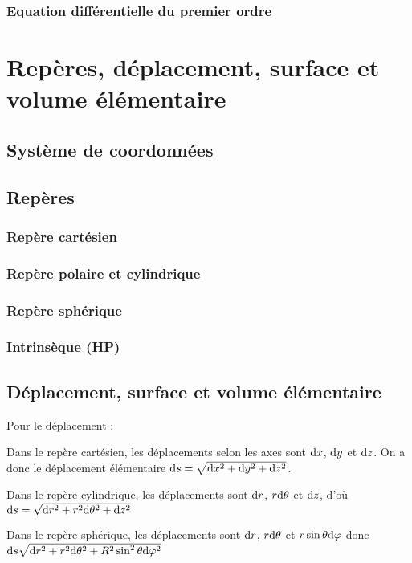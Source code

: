 \documentclass[a4paper,french,bookmarks]{book}
\begin{document}
    \subsubsection{Equation différentielle du premier ordre}
    
    \section{Repères, déplacement, surface et volume élémentaire}
    
    \subsection{Système de coordonnées}
    
    \subsection{Repères}
    
    \subsubsection{Repère cartésien}
    
    \subsubsection{Repère polaire et cylindrique}
    
    \subsubsection{Repère sphérique}
    
    \subsubsection{Intrinsèque (HP)}
    
    \subsection{Déplacement, surface et volume élémentaire}
    
    Pour le déplacement :
    
    \begin{enumerate}
        \itt Dans le repère cartésien, les déplacements selon les axes sont $\mathrm d x$, $\mathrm d y$ et $\mathrm d z$. On a donc le déplacement élémentaire $\mathrm d s = \sqrt{\mathrm d x^2 + \mathrm d y^2 + \mathrm d z^2}$.
        
        \itt Dans le repère cylindrique, les déplacements sont $\mathrm d r$, $r \mathrm d \theta$ et $\mathrm d z$, d'où $\mathrm d s = \sqrt{\mathrm d r^2 + r^2\mathrm d \theta^2 + \mathrm d z^2}$
        
        \itt Dans le repère sphérique, les déplacements sont $\mathrm d r$, $r\mathrm d \theta$ et $r\sin \theta\mathrm d \varphi$ donc $\mathrm d s \sqrt{\mathrm d r^2 + r^2\mathrm d \theta^2 + R^2\sin^2 \theta \mathrm d \varphi^2}$
    \end{enumerate}
    
\end{document}
